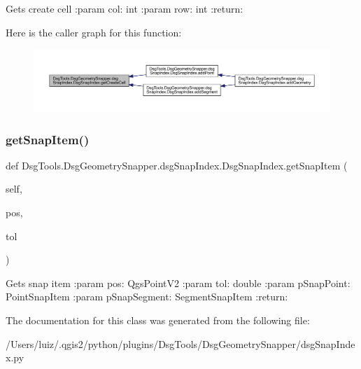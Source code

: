 \begin{DoxyVerb}Gets create cell
:param col: int
:param row: int
:return:
\end{DoxyVerb}
 Here is the caller graph for this function\+:
\nopagebreak
\begin{figure}[H]
\begin{center}
\leavevmode
\includegraphics[width=350pt]{class_dsg_tools_1_1_dsg_geometry_snapper_1_1dsg_snap_index_1_1_dsg_snap_index_a3ffaa95a4802e8d2185c0cc72cab0527_icgraph}
\end{center}
\end{figure}
\mbox{\label{class_dsg_tools_1_1_dsg_geometry_snapper_1_1dsg_snap_index_1_1_dsg_snap_index_aaf9c1b8145c136b2d5d28990edfa0d16}} 
\subsubsection{\texorpdfstring{get\+Snap\+Item()}{getSnapItem()}}
{\footnotesize\ttfamily def Dsg\+Tools.\+Dsg\+Geometry\+Snapper.\+dsg\+Snap\+Index.\+Dsg\+Snap\+Index.\+get\+Snap\+Item (\begin{DoxyParamCaption}\item[{}]{self,  }\item[{}]{pos,  }\item[{}]{tol }\end{DoxyParamCaption})}

\begin{DoxyVerb}Gets snap item
:param pos: QgsPointV2
:param tol: double
:param pSnapPoint: PointSnapItem
:param pSnapSegment: SegmentSnapItem
:return:
\end{DoxyVerb}
 

The documentation for this class was generated from the following file\+:\begin{DoxyCompactItemize}
\item 
/\+Users/luiz/.\+qgis2/python/plugins/\+Dsg\+Tools/\+Dsg\+Geometry\+Snapper/dsg\+Snap\+Index.\+py\end{DoxyCompactItemize}
